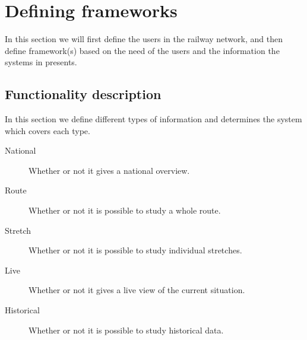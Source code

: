 
\section{Defining frameworks} %
\label{sec:defining_frameworks}
In this section we will first define the users in the railway network, and then
define framework(s) based on the need of the users and the information the
systems in  presents.

\subsection{Functionality description} %
\label{sub:functionality_description}
In this section we define different types of information and determines the
system which covers each type.

\begin{description}
	\item [National]	Whether or not it gives a national overview.
	\item [Route]		Whether or not it is possible to study a whole route.
	\item [Stretch]		Whether or not it is possible to study individual 						stretches.
	\item [Live]		Whether or not it gives a live view of the current 						situation.
	\item [Historical]	Whether or not it is possible to study historical data.
\end{description}

